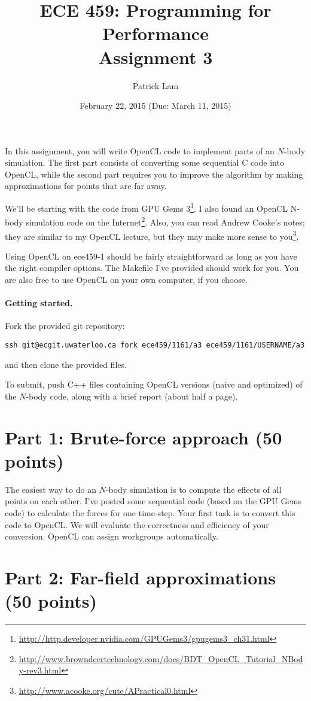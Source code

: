 \documentclass[letterpaper,10pt]{article}
\title{\bf ECE 459: Programming for Performance\\Assignment 3}
\author{Patrick Lam}
\date{February 22, 2015 (Due: March 11, 2015)}
\begin{document}
\maketitle

In this assignment, you will write OpenCL code to implement parts of
an $N$-body simulation.  The first part consists of converting some
sequential C code into OpenCL, while the second part requires you to
improve the algorithm by making approximations for points that are far
away.

We'll be starting with the code from GPU Gems 3\footnote{\url{http://http.developer.nvidia.com/GPUGems3/gpugems3_ch31.html}}.
I also found an OpenCL N-body simulation code on the Internet\footnote{\url{http://www.browndeertechnology.com/docs/BDT_OpenCL_Tutorial_NBody-rev3.html}}. Also, you can read Andrew Cooke's notes; they are similar to my OpenCL lecture, but they may make more sense to you\footnote{\url{http://www.acooke.org/cute/APractical0.html}}.

Using OpenCL on ece459-1 should be fairly straightforward as long as
you have the right compiler options. The Makefile I've provided
should work for you. You are also free to use OpenCL on your own
computer, if you choose.

\paragraph{Getting started.} Fork the provided git repository:
\begin{center}
{\tt ssh git@ecgit.uwaterloo.ca fork ece459/1161/a3 ece459/1161/USERNAME/a3}
\end{center}
\noindent and then clone the provided files.

To submit, push C++ files containing OpenCL versions (naive and optimized) of
the $N$-body code, along with a brief report (about half a page).

\section*{Part 1: Brute-force approach (50 points)}
The easiest way to do an $N$-body simulation is to compute the effects
of all points on each other. I've posted some sequential code (based
on the GPU Gems code) to calculate the forces for one time-step. Your
first task is to convert this code to OpenCL. We will evaluate the
correctness and efficiency of your conversion. OpenCL can assign
workgroups automatically.

\section*{Part 2: Far-field approximations (50 points)}
\end{document}
